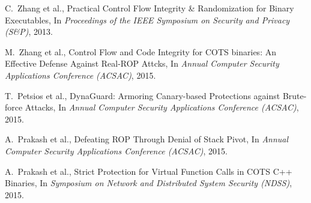 \documentclass[11pt,a4paper,bibtotoc,idxtotoc,headsepline,footsepline,footexclude,BCOR12mm,DIV13]{scrbook}
\begin{document}
\begin{thebibliography}{50}
C.~Zhang et al., {Practical Control Flow Integrity \& Randomization for Binary Executables}, In
\emph{Proceedings of the IEEE Symposium on Security and Privacy (S\&P)}, 2013.

M.~Zhang et al., {Control Flow and Code Integrity for COTS binaries: An Effective Defense Against Real-ROP Attcks}, In
\emph{Annual Computer Security Applications Conference (ACSAC)}, 2015.

T.~Petsios et al., {DynaGuard: Armoring Canary-based Protections against Brute-force Attacks}, In
\emph{Annual Computer Security Applications Conference (ACSAC)}, 2015.

A.~Prakash et al., {Defeating ROP Through Denial of Stack Pivot}, In
\emph{Annual Computer Security Applications Conference (ACSAC)}, 2015.

A.~Prakash et al., {Strict Protection for Virtual Function Calls in COTS C++ Binaries}, In
\emph{Symposium on Network and Distributed System Security (NDSS)}, 2015.



\end{thebibliography}
	
 
\end{document}
